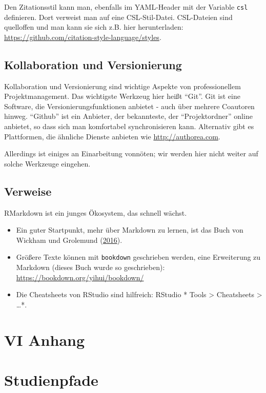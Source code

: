 \documentclass[12pt,]{book}
\begin{document}
Den Zitationsstil kann man, ebenfalls im YAML-Header mit der Variable
\texttt{csl} definieren. Dort verweist man auf eine CSL-Stil-Datei.
CSL-Dateien sind quelloffen und man kann sie sich z.B. hier
herunterladen: \url{https://github.com/citation-style-language/styles}.

\section{Kollaboration und
Versionierung}\label{kollaboration-und-versionierung}

Kollaboration und Versionierung sind wichtige Aspekte von
professionellem Projektmanagement. Das wichtigste Werkzeug hier heißt
``Git''. Git ist eine Software, die Versionierungsfunktionen anbietet -
auch über mehrere Coautoren hinweg. ``Github'' ist ein Anbieter, der
bekannteste, der ``Projektordner'' online anbietet, so dass sich man
komfortabel synchronisieren kann. Alternativ gibt es Plattformen, die
ähnliche Dienste anbieten wie \url{http://authorea.com}.

Allerdings ist einiges an Einarbeitung vonnöten; wir werden hier nicht
weiter auf solche Werkzeuge eingehen.

\section{Verweise}\label{verweise-6}

RMarkdown ist ein junges Ökosystem, das schnell wächst.

\begin{itemize}
\item
  Ein guter Startpunkt, mehr über Markdown zu lernen, ist das Buch von
  Wickham und Grolemund (\protect\hyperlink{ref-r4ds}{2016}).
\item
  Größere Texte können mit \texttt{bookdown} geschrieben werden, eine
  Erweiterung zu Markdown (dieses Buch wurde so geschrieben):
  \url{https://bookdown.org/yihui/bookdown/}
\item
  Die Cheatsheets von RStudio sind hilfreich: RStudio * Tools
  \textgreater{} Cheatsheets \textgreater{} \ldots{}*.
\end{itemize}

\chapter*{VI Anhang}\label{vi-anhang}

\chapter{Studienpfade}\label{studienpfade}
\end{document}
